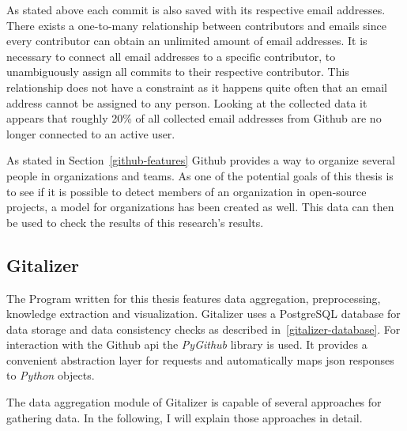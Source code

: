 As stated above each commit is also saved with its respective email addresses.
There exists a one-to-many relationship between contributors and emails since every contributor can obtain an unlimited amount of email addresses.
It is necessary to connect all email addresses to a specific contributor, to unambiguously assign all commits to their respective contributor.
This relationship does not have a  constraint as it happens quite often that an email address cannot be assigned to any person.
Looking at the collected data it appears that roughly 20\% of all collected email addresses from Github are no longer connected to an active user.

As stated in Section~\ref{github-features} Github provides a way to organize several people in organizations and teams.
As one of the potential goals of this thesis is to see if it is possible to detect members of an organization in open-source projects, a model for organizations has been created as well.
This data can then be used to check the results of this research's results.


\subsection{Gitalizer}
The Program written for this thesis features data aggregation, preprocessing, knowledge extraction and visualization.
Gitalizer uses a PostgreSQL database for data storage and data consistency checks as described in~\ref{gitalizer-database}.
For interaction with the Github \ac{api} the \emph{PyGithub} library is used.
It provides a convenient abstraction layer for requests and automatically maps \ac{json} responses to \emph{Python} objects.

The data aggregation module of Gitalizer is capable of several approaches for gathering data.
In the following, I will explain those approaches in detail.

